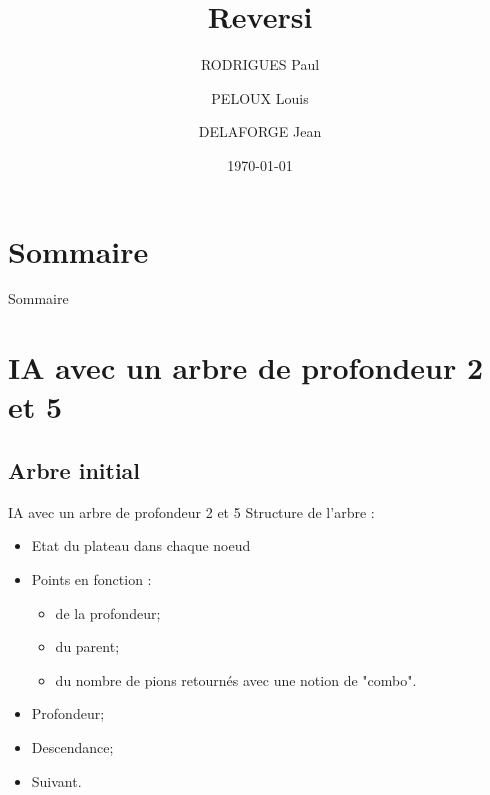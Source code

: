 \documentclass{beamer}
\title{Reversi}
\author{RODRIGUES Paul \and PELOUX Louis \and DELAFORGE Jean}
\date{\today}
\begin{document}
\maketitle

\section*{Sommaire}
\begin{frame}{Sommaire}
    \tableofcontents
\end{frame}

\section{IA avec un arbre de profondeur 2 et 5}
\subsection{Arbre initial}
\begin{frame}{IA avec un arbre de profondeur 2 et 5}
    Structure de l'arbre :
    \begin{itemize}
        \item Etat du plateau dans chaque noeud
        \item Points en fonction :
        \begin{itemize}
            \item de la profondeur;
            \item du parent;
            \item du nombre de pions retournés avec une notion de "combo".
        \end{itemize}
        \item Profondeur;
        \item Descendance;
        \item Suivant.
    \end{itemize}
\end{frame}
\end{document}
